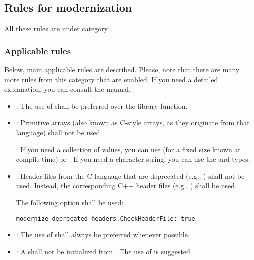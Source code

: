 \subsection{Rules for modernization}

All these rules are under category
.

\subsubsection{Applicable rules}

Below, main applicable rules are described. Please, note that there are many
more rules from this category that are enabled. If you need a detailed
explanation, you can consult the  manual.

\begin{itemize}

\item {}:
The use of  shall be preferred over the
 library function.

\item {}:
Primitive arrays (also known as C-style arrays, as they originate from that
language) shall not be used.

: If you need a collection of values, you can use
 (for a fixed size known at compile time) or
. If you need a character string, you can use the
 and  types.

\item {}:
Header files from the C language that are deprecated (e.g., )
shall not be used. Instead, the corresponding C++ header files (e.g.,
) shall be used.

The following option shall be used:

\begin{lstlisting}
modernize-deprecated-headers.CheckHeaderFile: true
\end{lstlisting}

\item {}:
The use of  shall always be preferred whenever
possible.

\item {}:
A  shall not be initialized from .
The use of  is suggested.


\end{itemize}
